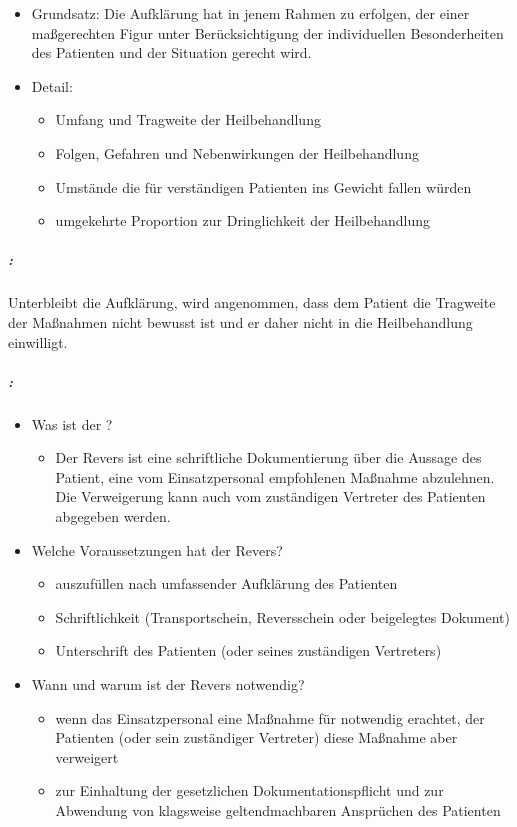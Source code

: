 {\begin{itemize}
  \item Grundsatz: Die Aufklärung hat in jenem Rahmen zu erfolgen, der einer
  maßgerechten Figur unter Berücksichtigung der individuellen
  Besonderheiten des Patienten und der Situation gerecht
  wird.
  \item Detail:
  \begin{itemize}
    \item Umfang und Tragweite der  Heilbehandlung
    \item Folgen, Gefahren und Nebenwirkungen der
    Heilbehandlung
    \item Umstände die für verständigen Patienten ins
    Gewicht fallen würden
    \item umgekehrte Proportion zur Dringlichkeit der
    Heilbehandlung
  \end{itemize}
\end{itemize}

\subparagraph{:}
Unterbleibt die Aufklärung, wird angenommen, dass dem
Patient die Tragweite der Maßnahmen nicht bewusst ist und er daher nicht in die
Heilbehandlung einwilligt.

\subparagraph{:}
\label{topic:revers}

\begin{itemize}
  \item Was ist der ?
  \begin{itemize}
    \item
    Der Revers ist eine schriftliche Dokumentierung über die Aussage des
    Patient, eine vom Einsatz\-personal empfohlenen Maßnahme
    abzulehnen. Die Verweigerung kann auch vom zuständigen Vertreter des
    Patienten abgegeben werden.
  \end{itemize}
  \item Welche Voraussetzungen hat der Revers?
  \begin{itemize}
    \item auszufüllen nach umfassender Aufklärung des Patienten
    \item Schriftlichkeit (Transportschein, Reversschein oder beigelegtes
    Dokument)
    \item Unterschrift des Patienten (oder seines zuständigen Vertreters)
  \end{itemize}
  \item Wann und warum ist der Revers notwendig?
  \begin{itemize}
    \item wenn das Einsatzpersonal eine Maßnahme für notwendig erachtet,
    der Patienten  (oder sein zuständiger Vertreter) diese Maßnahme
    aber verweigert
    \item zur Einhaltung der gesetzlichen Dokumentationspflicht und zur Abwendung
    von  klagsweise geltendmachbaren Ansprüchen des Patienten
  \end{itemize}
\end{itemize}

}
